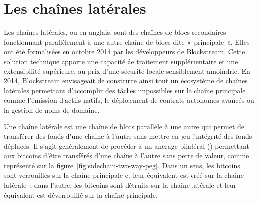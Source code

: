 
\section*{Les chaînes latérales}


Les chaînes latérales, ou  en anglais, sont des chaînes de blocs secondaires fonctionnant parallèlement à une autre chaîne de blocs dite «~principale~». Elles ont été formalisées en octobre 2014 par les développeurs de Blockstream. Cette solution technique apporte une capacité de traitement supplémentaire et une extensibilité supérieure, au prix d'une sécurité locale sensiblement amoindrie. En 2014, Blockstream envisageait de construire ainsi tout un écosystème de chaînes latérales permettant d'accomplir des tâches impossibles sur la chaîne principale comme l'émission d'actifs natifs, le déploiement de contrats autonomes avancés ou la gestion de noms de domaine.


Une chaîne latérale est une chaîne de blocs parallèle à une autre qui permet de transférer des fonds d'une chaîne à l'autre sans mettre en jeu l'intégrité des fonds déplacés. Il s'agit généralement de procéder à un ancrage bilatéral () permettant aux bitcoins d'être transférés d'une chaîne à l'autre sans perte de valeur, comme représenté sur la figure~\ref{fig:sidechain-two-way-peg}. Dans un sens, les bitcoins sont verrouillés sur la chaîne principale et leur équivalent est créé sur la chaîne latérale~; dans l'autre, les bitcoins sont détruits sur la chaîne latérale et leur équivalent est déverrouillé sur la chaîne principale.

